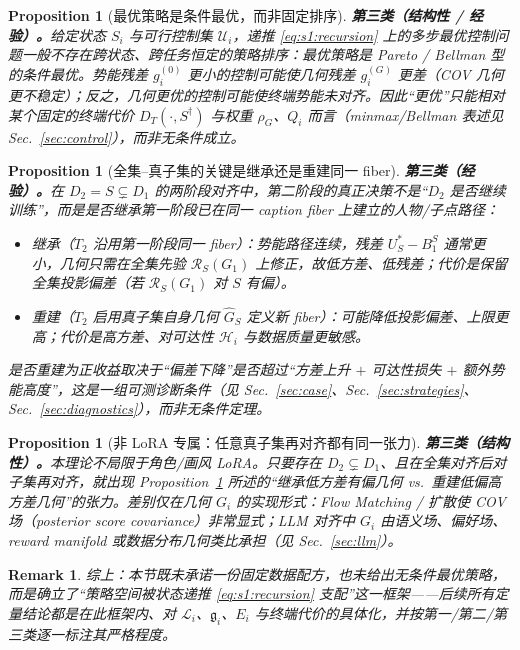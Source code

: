 \documentclass[11pt,a4paper]{article}
\newtheorem{proposition}[theorem]{Proposition}
\newtheorem{remark}[theorem]{Remark}
\newcommand{\cH}{\mathcal{H}}   %
\newcommand{\cL}{\mathcal{L}}   %
\newcommand{\cU}{\mathcal{U}}   %
\newcommand{\Rstr}{\mathcal{R}}     %
\newcommand{\gres}{\bm{\mathfrak{g}}} %
\begin{document}
\begin{proposition}[最优策略是条件最优，而非固定排序]\label{prop:s1:pareto}
\textbf{第三类（结构性 / 经验）。}给定状态 $S_i$ 与可行控制集 $\cU_i$，递推 \eqref{eq:s1:recursion} 上的多步最优控制问题一般不存在跨状态、跨任务恒定的策略排序：最优策略是 Pareto / Bellman 型的\emph{条件最优}。势能残差 $g_i^{(0)}$ 更小的控制可能使几何残差 $g_i^{(G)}$ 更差（COV 几何更不稳定）；反之，几何更优的控制可能使终端势能未对齐。因此“更优”只能相对某个固定的终端代价 $D_T(\cdot,S^\dagger)$ 与权重 $\rho_G$、$Q_i$ 而言（minmax/Bellman 表述见 Sec.~\ref{sec:control}），而非无条件成立。
\end{proposition}

\begin{proposition}[全集--真子集的关键是继承还是重建同一 fiber]\label{prop:s1:inherit-rebuild}
\textbf{第三类（经验）。}在 $D_2=S\subsetneq D_1$ 的两阶段对齐中，第二阶段的真正决策\emph{不是}“$D_2$ 是否继续训练”，而是\emph{是否继承第一阶段已在同一 caption fiber 上建立的人物/子点路径}：
\begin{itemize}
  \item \emph{继承}（$T_2$ 沿用第一阶段同一 fiber）：势能路径连续，残差 $U_S^*-B_1^S$ 通常更小，几何只需在全集先验 $\Rstr_S(G_1)$ 上修正，故\emph{低方差、低残差}；代价是\emph{保留全集投影偏差}（若 $\Rstr_S(G_1)$ 对 $S$ 有偏）。
  \item \emph{重建}（$T_2$ 启用真子集自身几何 $\widehat G_S$ 定义新 fiber）：可能降低投影偏差、上限更高；代价是\emph{高方差}、对可达性 $\cH_i$ 与数据质量更敏感。
\end{itemize}
是否重建为正收益取决于“偏差下降”是否超过“方差上升 $+$ 可达性损失 $+$ 额外势能高度”，这是一组可测诊断条件（见 Sec.~\ref{sec:case}、Sec.~\ref{sec:strategies}、Sec.~\ref{sec:diagnostics}），而非无条件定理。
\end{proposition}

\begin{proposition}[非 LoRA 专属：任意真子集再对齐都有同一张力]\label{prop:s1:generality}
\textbf{第三类（结构性）。}本理论不局限于角色/画风 LoRA。只要存在 $D_2\subsetneq D_1$、且在全集对齐后对子集再对齐，就出现 Proposition~\ref{prop:s1:inherit-rebuild} 所述的“继承低方差有偏几何 vs.\ 重建低偏高方差几何”的张力。差别仅在几何 $G_i$ 的实现形式：Flow Matching / 扩散使 COV 场（posterior score covariance）非常显式；LLM 对齐中 $G_i$ 由语义场、偏好场、reward manifold 或数据分布几何类比承担（见 Sec.~\ref{sec:llm}）。
\end{proposition}

\begin{remark}\label{rem:s1:thesis-summary}
综上：本节既未承诺一份固定数据配方，也未给出无条件最优策略，而是确立了“策略空间被状态递推 \eqref{eq:s1:recursion} 支配”这一框架——后续所有定量结论都是在此框架内、对 $\cL_i$、$\gres_i$、$E_i$ 与终端代价的具体化，并按第一/第二/第三类逐一标注其严格程度。
\end{remark}
\end{document}
